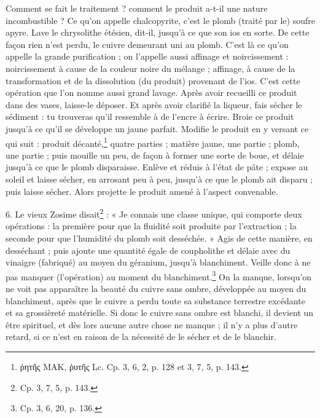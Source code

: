 \documentclass[a4paper, 11pt, oneside, polutonikogreek, french]{article}
\begin{document}
Comment se fait le traitement ? comment le produit a-t-il une nature incombustible ? Ce qu'on appelle chalcopyrite, c'est le plomb (traité par le) soufre apyre. Lave le chrysolithe étésien, dit-il, jusqu'à ce que son ios en sorte. De cette façon rien n'est perdu, le cuivre demeurant uni au plomb. C'est là ce qu'on appelle la grande purification ; on l'appelle aussi affinage et noircissement : noircissement à cause de la couleur noire du mélange ; affinage, à cause de la transformation et de la dissolution (du produit) provenant de l'ios. C'est cette opération que l'on nomme aussi grand lavage. Après avoir recueilli ce produit dans des vases, laisse-le déposer. Et après avoir clarifié la liqueur, fais sécher le sédiment : tu trouveras qu'il ressemble à de l'encre à écrire. Broie ce produit jusqu'à ce qu'il se développe un jaune parfait. Modifie le produit en y versant ce qui suit : produit décanté,\footnote{ῥητῆς MAK, ῥυτῆς Lc. Cp. 3, 6, 2, p. 128 et 3, 7, 5, p. 143.} quatre parties ; matière jaune, une partie ; plomb, une partie ; puis mouille un peu, de façon à former une sorte de boue, et délaie jusqu'à ce que le plomb disparaisse. Enlève et réduis à l'état de pâte ; expose au soleil et laisse sécher, en arrosant peu à peu, jusqu'à ce que le plomb ait disparu ; puis laisse sécher. Alors projette le produit amené à l'aspect convenable.

6. Le vieux Zosime disait\footnote{Cp. 3, 7, 5, p. 143.} : « Je connais une classe unique, qui comporte deux opérations : la première pour que la fluidité soit produite par l'extraction ; la seconde pour que l'humidité du plomb soit desséchée. » Agis de cette manière, en desséchant ; puis ajoute une quantité égale de coupholithe et délaie avec du vinaigre (fabriqué) au moyen du géranium, jusqu'à blanchiment. Veille donc à ne pas manquer (l'opération) au moment du blanchiment.\footnote{Cp. 3, 6, 20, p. 136.} On la manque, lorsqu'on ne voit pas apparaître la beauté du cuivre sans ombre, développée au moyen du blanchiment, après que le cuivre a perdu toute sa substance terrestre excédante et sa grossièreté matérielle. Si donc le cuivre sans ombre est blanchi, il devient un être spirituel, et dès lors aucune autre chose ne manque ; il n'y a plus d'autre retard, si ce n'est en raison de la nécessité de le sécher et de le blanchir.
\end{document}

